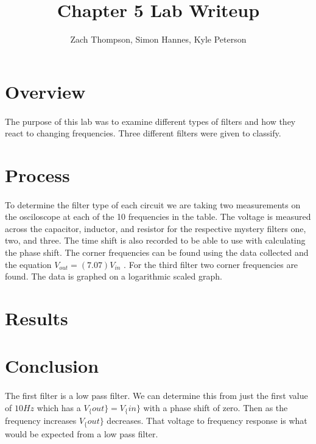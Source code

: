 \documentclass{article}
\title{Chapter 5 Lab Writeup}
\author{Zach Thompson, Simon Hannes, Kyle Peterson}
\begin{document}
\maketitle{}

\section*{Overview}
\paragraph{}
The purpose of this lab was to examine different types of filters and how they react to changing frequencies.
Three different filters were given to classify.



\section*{Process}
\paragraph{}
To determine the filter type of each circuit we are taking two measurements on the osciloscope at each of the 
10 frequencies in the table. The voltage is measured across the capacitor, inductor, and resistor for the 
respective mystery filters one, two, and three. The time shift is also recorded to be able to use with 
calculating the phase shift. The corner frequencies can be found using the data collected and the equation 
$ V_{out} = (7.07)   V_{in}$ . For the third filter two corner frequencies are found. The data is graphed on 
a logarithmic scaled graph.

\section*{Results}

\section*{Conclusion}
\paragraph{}
The first filter is a low pass filter. We can determine this from just the first value of $10Hz$ which has a 
$V_\{out\} = V_\{in\}$ with a phase shift of zero. Then as the frequency increases $V_\{out\}$ decreases. That
voltage to frequency response is what would be expected from a low pass filter.
\end{document}
